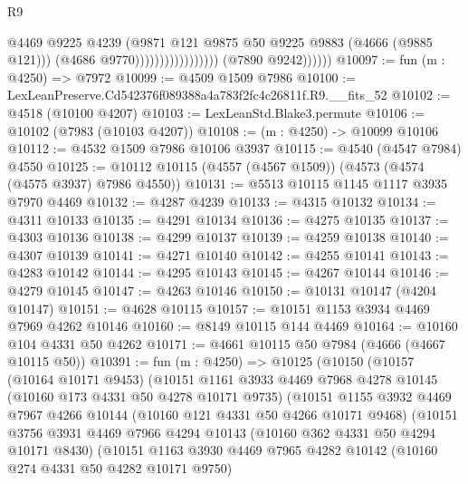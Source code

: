 \begin{lexlean}{R9}
\begin{coremodule}
                                              @4469
                                              @9225
                                              @4239
                                              (@9871
                                                @121
                                                @9875
                                                @50
                                                @9225
                                                @9883
                                                (@4666 (@9885 @121)))
                                              (@4686 @9770)))))))))))))))))
              (@7890 @9242))))))
@10097 := fun (m : @4250) => @7972
@10099 := @4509 @1509 @7986
@10100 := LexLeanPreserve.Cd542376f089388a4a783f2fc4c26811f.R9.__fits_52
@10102 := @4518 (@10100 @4207)
@10103 := LexLeanStd.Blake3.permute
@10106 := @10102 (@7983 (@10103 @4207))
@10108 := (m : @4250) -> @10099 @10106
@10112 := @4532 @1509 @7986 @10106 @3937
@10115 := @4540 (@4547 @7984) @4550
@10125 := @10112 @10115 (@4557 (@4567 @1509)) (@4573 (@4574 (@4575 @3937) @7986 @4550))
@10131 := @5513 @10115 @1145 @1117 @3935 @7970 @4469
@10132 := @4287 @4239
@10133 := @4315 @10132
@10134 := @4311 @10133
@10135 := @4291 @10134
@10136 := @4275 @10135
@10137 := @4303 @10136
@10138 := @4299 @10137
@10139 := @4259 @10138
@10140 := @4307 @10139
@10141 := @4271 @10140
@10142 := @4255 @10141
@10143 := @4283 @10142
@10144 := @4295 @10143
@10145 := @4267 @10144
@10146 := @4279 @10145
@10147 := @4263 @10146
@10150 := @10131 @10147 (@4204 @10147)
@10151 := @4628 @10115
@10157 := @10151 @1153 @3934 @4469 @7969 @4262 @10146
@10160 := @8149 @10115 @144 @4469
@10164 := @10160 @104 @4331 @50 @4262
@10171 := @4661 @10115 @50 @7984 (@4666 (@4667 @10115 @50))
@10391 := fun (m : @4250) =>
  @10125
    (@10150
      (@10157
        (@10164 @10171 @9453)
        (@10151
          @1161
          @3933
          @4469
          @7968
          @4278
          @10145
          (@10160 @173 @4331 @50 @4278 @10171 @9735)
          (@10151
            @1155
            @3932
            @4469
            @7967
            @4266
            @10144
            (@10160 @121 @4331 @50 @4266 @10171 @9468)
            (@10151
              @3756
              @3931
              @4469
              @7966
              @4294
              @10143
              (@10160 @362 @4331 @50 @4294 @10171 @8430)
              (@10151
                @1163
                @3930
                @4469
                @7965
                @4282
                @10142
                (@10160 @274 @4331 @50 @4282 @10171 @9750)

\end{coremodule}
\end{lexlean}
